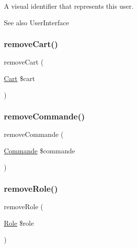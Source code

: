 A visual identifier that represents this user.

\begin{DoxySeeAlso}{See also}
User\+Interface 
\end{DoxySeeAlso}
\mbox{\label{class_app_1_1_entity_1_1_users_a9aff9e8abf19d0390713e9ead0968f85}} 
\subsubsection{\texorpdfstring{remove\+Cart()}{removeCart()}}
{\footnotesize\ttfamily remove\+Cart (\begin{DoxyParamCaption}\item[{\mbox{\hyperlink{class_app_1_1_entity_1_1_cart}{Cart}}}]{\$cart }\end{DoxyParamCaption})}

\mbox{\label{class_app_1_1_entity_1_1_users_a98184ff8c042500a02552ee0cc6e305b}} 
\subsubsection{\texorpdfstring{remove\+Commande()}{removeCommande()}}
{\footnotesize\ttfamily remove\+Commande (\begin{DoxyParamCaption}\item[{\mbox{\hyperlink{class_app_1_1_entity_1_1_commande}{Commande}}}]{\$commande }\end{DoxyParamCaption})}

\mbox{\label{class_app_1_1_entity_1_1_users_af336604c8c29aedc9c573c8499bce742}} 
\subsubsection{\texorpdfstring{remove\+Role()}{removeRole()}}
{\footnotesize\ttfamily remove\+Role (\begin{DoxyParamCaption}\item[{\mbox{\hyperlink{class_app_1_1_entity_1_1_role}{Role}}}]{\$role }\end{DoxyParamCaption})}

